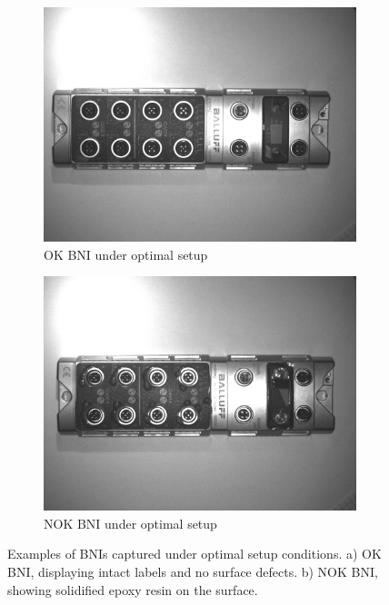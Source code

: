 \documentclass[12pt,DIV14,BCOR12mm,a4paper,footinclude=false,headinclude,parskip=half-,twoside,openright,cleardoublepage=empty,toc=index,bibliography=totoc,listof=totoc]{scrreprt}
\numberwithin{equation}{chapter}
\begin{document}
\begin{figure}
    \centering
    \begin{subfigure}[b]{0.45\textwidth}
        \centering
        \includegraphics[scale=0.15]{../media/BNI-optimal-OK.png}
        \caption{OK BNI under optimal setup}
        \label{fig:bni_ok}
    \end{subfigure}
    \hfill
    \begin{subfigure}[b]{0.45\textwidth}
        \centering
        \includegraphics[scale=0.15]{../media/BNI-optimal-NOK.png}
        \caption{NOK BNI under optimal setup}
        \label{fig:bni_nok}
    \end{subfigure}
    \caption{Examples of BNIs captured under optimal setup conditions. a) OK BNI, displaying intact labels and no surface defects. b) NOK BNI, showing solidified epoxy resin on the surface.}
    \label{fig:optimal_setup_bnis}
\end{figure}
\end{document}
